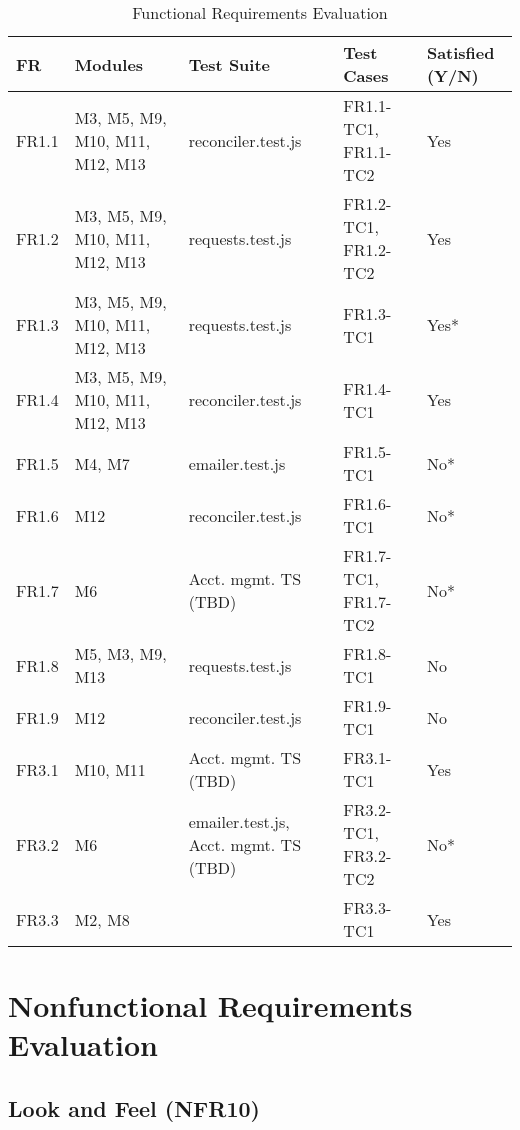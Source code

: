 \documentclass[12pt, titlepage]{article}
\begin{document}
\begin{table}[ht]
    \centering
    \footnotesize
    \caption{Functional Requirements Evaluation}
    \label{tab:FReval}
    \begin{tabular}{|p{1.2cm}|p{2.7cm}|p{2.4cm}|p{2.2cm}|p{1.4cm}|}
    \hline
    \textbf{FR} & \textbf{Modules} & \textbf{Test Suite} & \textbf{Test Cases} & \textbf{Satisfied (Y/N)} \\
    \hline
    FR1.1 & M3, M5, M9, M10, M11, M12, M13 & reconciler.test.js & FR1.1-TC1, FR1.1-TC2 & Yes \\
    \hline
    FR1.2 & M3, M5, M9, M10, M11, M12, M13 & requests.test.js & FR1.2-TC1, FR1.2-TC2 & Yes\\
    \hline
    FR1.3 & M3, M5, M9, M10, M11, M12, M13 & requests.test.js & FR1.3-TC1 & Yes*\\
    \hline
    FR1.4 & M3, M5, M9, M10, M11, M12, M13 & reconciler.test.js & FR1.4-TC1 & Yes\\
    \hline
    FR1.5 & M4, M7 & emailer.test.js & FR1.5-TC1 & No*\\
    \hline
    FR1.6 & M12 & reconciler.test.js & FR1.6-TC1 & No*\\
    \hline
    FR1.7 & M6 & Acct. mgmt. TS (TBD) & FR1.7-TC1, FR1.7-TC2 & No*\\
    \hline
    FR1.8 & M5, M3, M9, M13 & requests.test.js & FR1.8-TC1 & No\\
    \hline
    FR1.9 & M12 & reconciler.test.js & FR1.9-TC1 & No\\
    \hline
    FR3.1 & M10, M11 & Acct. mgmt. TS (TBD) & FR3.1-TC1 & Yes\\
    \hline
    FR3.2 & M6 & emailer.test.js, Acct. mgmt. TS (TBD) & FR3.2-TC1, FR3.2-TC2 & No*\\
    \hline
    FR3.3 & M2, M8 & & FR3.3-TC1 & Yes\\
    \hline
    \end{tabular}
    \normalsize
\end{table}

\newpage

\section{Nonfunctional Requirements Evaluation}

\subsection{Look and Feel (NFR10)}  
\label{nfr10}
\end{document}
